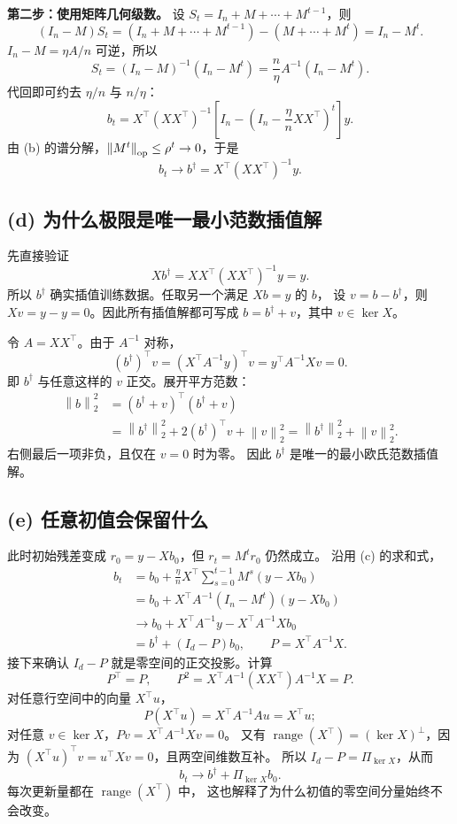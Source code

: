\documentclass[UTF8,a4paper,11pt,fontset=fandol]{ctexart}
\newcommand{\norm}[1]{\left\lVert#1\right\rVert}
\begin{document}
\textbf{第二步：使用矩阵几何级数。}
设 $S_t=I_n+M+\cdots+M^{t-1}$，则
\[
 (I_n-M)S_t=(I_n+M+\cdots+M^{t-1})-(M+\cdots+M^t)=I_n-M^t.
\]
$I_n-M=\eta A/n$ 可逆，所以
\[
 S_t=(I_n-M)^{-1}(I_n-M^t)=\frac n\eta A^{-1}(I_n-M^t).
\]
代回即可约去 $\eta/n$ 与 $n/\eta$：
\[
 \boxed{b_t=X^\top(XX^\top)^{-1}
 \left[I_n-\left(I_n-\frac\eta nXX^\top\right)^t\right]y.}
\]
由 (b) 的谱分解，$\norm{M^t}_{\rm op}\leq\rho^t\to0$，于是
\[
 b_t\longrightarrow\boxed{b^\dagger=X^\top(XX^\top)^{-1}y}.
\]

\subsection*{(d) 为什么极限是唯一最小范数插值解}
先直接验证
\[
 Xb^\dagger=XX^\top(XX^\top)^{-1}y=y.
\]
所以 $b^\dagger$ 确实插值训练数据。任取另一个满足 $Xb=y$ 的 $b$，
设 $v=b-b^\dagger$，则 $Xv=y-y=0$。因此所有插值解都可写成
$b=b^\dagger+v$，其中 $v\in\ker X$。

令 $A=XX^\top$。由于 $A^{-1}$ 对称，
\[
 (b^\dagger)^\top v=(X^\top A^{-1}y)^\top v
 =y^\top A^{-1}Xv=0.
\]
即 $b^\dagger$ 与任意这样的 $v$ 正交。展开平方范数：
\begin{align*}
 \norm b_2^2
 &=(b^\dagger+v)^\top(b^\dagger+v)\\
 &=\norm{b^\dagger}_2^2+2(b^\dagger)^\top v+\norm v_2^2
 =\norm{b^\dagger}_2^2+\norm v_2^2.
\end{align*}
右侧最后一项非负，且仅在 $v=0$ 时为零。
因此 $b^\dagger$ 是唯一的最小欧氏范数插值解。

\subsection*{(e) 任意初值会保留什么}
此时初始残差变成 $r_0=y-Xb_0$，但 $r_t=M^t r_0$ 仍然成立。
沿用 (c) 的求和式，
\begin{align*}
 b_t&=b_0+\frac\eta nX^\top\sum_{s=0}^{t-1}M^s(y-Xb_0)\\
 &=b_0+X^\top A^{-1}(I_n-M^t)(y-Xb_0)\\
 &\longrightarrow b_0+X^\top A^{-1}y-X^\top A^{-1}Xb_0\\
 &=b^\dagger+(I_d-P)b_0,\qquad P=X^\top A^{-1}X.
\end{align*}
接下来确认 $I_d-P$ 就是零空间的正交投影。计算
\[
 P^\top=P,\qquad
 P^2=X^\top A^{-1}(XX^\top)A^{-1}X=P.
\]
对任意行空间中的向量 $X^\top u$，
\[
 P(X^\top u)=X^\top A^{-1}Au=X^\top u;
\]
对任意 $v\in\ker X$，$Pv=X^\top A^{-1}Xv=0$。
又有 $\operatorname{range}(X^\top)=(\ker X)^\perp$，因为
$(X^\top u)^\top v=u^\top Xv=0$，且两空间维数互补。
所以 $I_d-P=\Pi_{\ker X}$，从而
\[
 \boxed{b_t\longrightarrow b^\dagger+\Pi_{\ker X}b_0.}
\]
每次更新量都在 $\operatorname{range}(X^\top)$ 中，
这也解释了为什么初值的零空间分量始终不会改变。
\end{document}
